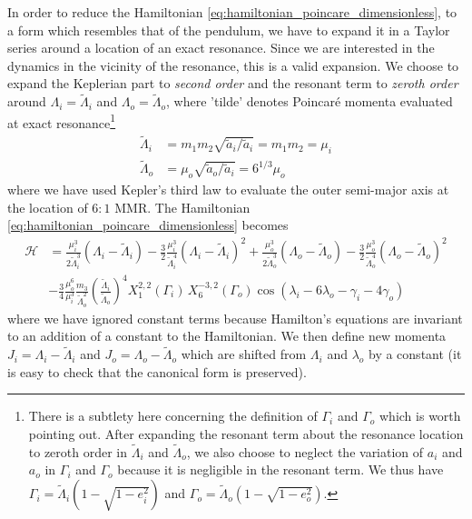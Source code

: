 \documentclass[ twoside,openright,titlepage,numbers=noenddot,headinclude,%
                footinclude=true,cleardoublepage=empty,abstractoff, %
                BCOR=5mm,paper=a4,fontsize=11pt,%
                american,%
                ]{scrreprt}
\begin{document}
In order to reduce the Hamiltonian \ref{eq:hamiltonian_poincare_dimensionless},
to a form which resembles that of the pendulum, we have to expand it in a 
Taylor series around a location of an exact resonance. Since we are interested
in the dynamics in the vicinity of the resonance, this is a valid expansion.
We choose to expand the Keplerian part to \emph{second order} and the
resonant term to \emph{zeroth order} around $\Lambda_i=\tilde{\Lambda}_i$ 
and $\Lambda_o=\tilde{\Lambda}_o$, where 'tilde' denotes Poincaré
momenta evaluated at exact resonance\footnote{There is a subtlety  here concerning the
definition of $\Gamma_i$ and $\Gamma_o$ which is worth pointing out. After expanding the
resonant term about the resonance location to zeroth order in 
$\tilde{\Lambda}_i$ and $\tilde{\Lambda}_o$, we also choose to neglect
the variation of $a_i$ and $a_o$ in $\Gamma_i$ and $\Gamma_o$
because it is negligible in the resonant term. 
We thus have $\Gamma_i=\tilde{\Lambda}_i\left(1-\sqrt{1-e_i^2}\right)$ and
$\Gamma_o=\tilde{\Lambda}_o\left(1-\sqrt{1-e_o^2}\right)$.}
\begin{equation}
    \begin{aligned}
        \tilde{\Lambda}_i&=m_1m_2\sqrt{\tilde{a}_i/\tilde{a}_i}=m_1m_2=\mu_i\\
        \tilde{\Lambda}_o&=\mu_o\sqrt{\tilde{a}_o/\tilde{a}_i}=6^{1/3}\mu_o
    \end{aligned}
\end{equation}
where we have used Kepler's third law to evaluate the outer semi-major axis
at the location of $6:1$ MMR. The Hamiltonian 
\ref{eq:hamiltonian_poincare_dimensionless} becomes
\begin{equation}
    \begin{aligned}
        \mathcal{H}&=\frac{\mu_i^3}{2\tilde{\Lambda}_i^3}
        (\Lambda_i-\tilde{\Lambda}_i) - \frac{3}{2}
        \frac{\mu_i^3}{\tilde{\Lambda}_i^4} (\Lambda_i-\tilde{\Lambda}_i)^2+
    \frac{\mu_o^3}{2\tilde{\Lambda}_o^3}
        (\Lambda_o-\tilde{\Lambda}_o) - \frac{3}{2}
        \frac{\mu_o^3}{\tilde{\Lambda}_o^4} (\Lambda_o-\tilde{\Lambda}_o)^2\\
        &-\frac{3}{4} \frac{\mu_o^6}{\mu_i^3} 
        \frac{m_3}{\tilde{\Lambda}_o^2} \left(\frac{\tilde{\Lambda}_i}
        {\tilde{\Lambda}_o}\right)^4
    X^{2,2}_1(\Gamma_i)\,X^{-3,2}_6(\Gamma_o)\cos(\lambda_i-6\lambda_o
    -\gamma_i - 4\gamma_o)
    \end{aligned}
    \label{eq:hamiltonian_poincare_dimensionless_expanded}
\end{equation}
where we have ignored constant terms because Hamilton's equations are invariant
to an addition of a constant to the Hamiltonian. We then define new momenta
$J_i=\Lambda_i-\tilde{\Lambda}_i$ and $J_o=\Lambda_o-\tilde{\Lambda}_o$ 
which are shifted from $\Lambda_i$ and $\lambda_o$ by a constant (it is easy 
to check that the canonical form is preserved).
\end{document}
